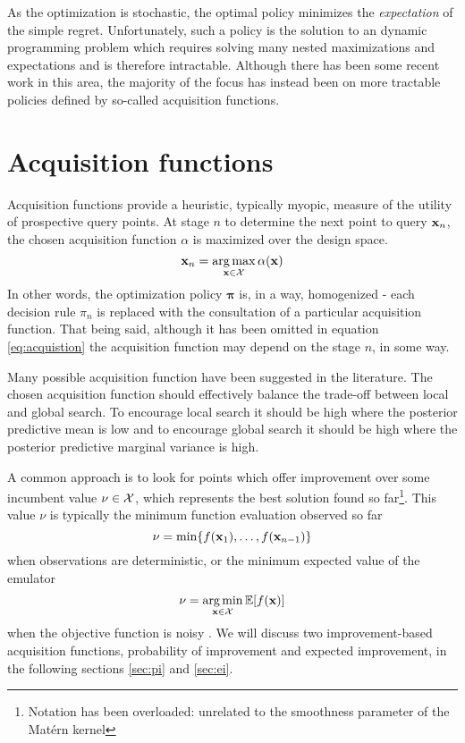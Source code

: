 As the optimization is stochastic, the optimal policy minimizes the \textit{expectation} of the simple regret. Unfortunately, such a policy is the solution to an dynamic programming problem which requires solving many nested maximizations and expectations \cite{lam2016bayesian} and is therefore intractable. Although there has been some recent work \cite{gonzalez2015glasses} \cite{lam2016bayesian} in this area, the majority of the focus has instead been on more tractable policies defined by so-called acquisition functions.

\section{Acquisition functions}

Acquisition functions provide a heuristic, typically myopic, measure of the utility of prospective query points. At stage $n$ to determine the next point to query $\mathbf{x}_{n}$, the chosen acquisition function $\alpha$ is maximized over the design space.
%
\begin{equation} \label{eq:acquistion}
\mathbf{x}_n = \operatorname*{arg\,max}_{\mathbf{x}\in\mathcal{X}} \alpha(\mathbf{x})
\end{equation}
%
In other words, the optimization policy $\bm{\pi}$ is, in a way, homogenized - each decision rule $\pi_n$ is replaced with the consultation of a particular acquisition function. That being said, although it has been omitted in equation \ref{eq:acquistion} the acquisition function may depend on the stage $n$, in some way.

Many possible acquisition function have been suggested in the literature. The chosen acquisition function should effectively balance the trade-off between local and global search. To encourage local search it should be high where the posterior predictive mean is low and to encourage global search it should be high where the posterior predictive marginal variance is high.

A common approach is to look for points which offer improvement over some incumbent value $\nu \in \mathcal{X}$, which represents the best solution found so far\footnote{Notation has been overloaded: unrelated to the smoothness parameter of the Matérn kernel}. This value $\nu$ is typically the minimum function evaluation observed so far 
%
\begin{equation}
\nu = \min \{f(\mathbf{x}_1), \ldots, f(\mathbf{x}_{n-1}) \}
\end{equation}
%
when observations are deterministic, or the minimum expected value of the emulator 
%
\begin{equation}
\nu = \operatorname*{arg\,min}_{\mathbf{x}\in\mathcal{X}} \mathbb{E}[f(\mathbf{x})]
\end{equation}
%
when the objective function is noisy \citep{lizotte}. We will discuss two improvement-based acquisition functions, probability of improvement and expected improvement, in the following sections \ref{sec:pi} and \ref{sec:ei}.


